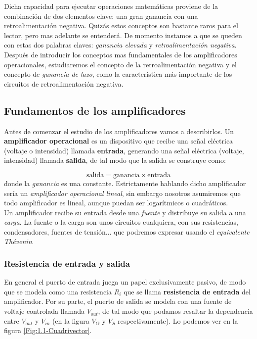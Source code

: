 \documentclass[11pt]{article} %
\begin{document}
Dicha capacidad para ejecutar operaciones matemáticas proviene de la combinación de dos elementos clave: una gran ganancia con una retroalimentación negativa. Quizás estos conceptos son bastante raros para el lector, pero mas adelante se entenderá. De momento instamos a que se queden con estas dos palabras claves: \textit{ganancia elevada} y \textit{retroalimentación negativa}. \\

Después de introducir los conceptos mas fundamentales de los amplificadores operacionales, estudiaremos el concepto de la retroalimentación negativa y el concepto de \textit{ganancia de lazo}, como la característica más importante de los circuitos de retroalimentación negativa.   

\subsection{Fundamentos de los amplificadores}

Antes de comenzar el estudio de los amplificadores vamos a describirlos. Un \textbf{amplificador operacional} es un dispositivo que recibe una señal eléctrica (voltaje o intensidad) llamada \textbf{entrada}, generando una señal eléctrica (voltaje, intensidad) llamada \textbf{salida}, de tal modo que la salida se construye como:

\begin{equation}
\mathrm{salida} = \mathrm{ganancia}  \times \mathrm{entrada}
\end{equation}
donde la \textit{ganancia} es una constante. Estrictamente hablando dicho amplificador sería un \textit{amplificador operacional lineal}, sin embargo nosotros asumiremos que todo amplificador es lineal, aunque puedan ser logarítmicos o cuadráticos. \\

Un amplificador recibe su entrada desde una \textit{fuente} y distribuye su salida a una \textit{carga}. La fuente o la carga son unos circuitos cualquiera, con sus resistencias, condensadores, fuentes de tensión... que podremos expresar usando el \textit{equivalente Thévenin}.  \\


\subsubsection{Resistencia de entrada y salida}

En general el puerto de entrada juega un papel exclusivamente pasivo, de modo que se modela como una resistencia $R_i$ que se llama \textbf{resistencia de entrada} del amplificador. Por su parte, el puerto de salida se modela con una fuente de voltaje controlada llamada $V_{out}$, de tal modo que podamos resaltar la dependencia entre $V_{out}$ y $V_{in}$ (en la figura $V_O$ y $V_S$ respectivamente). Lo podemos ver en la figura \ref{Fig:1.1-Cuadrivector}. \\
\end{document}
